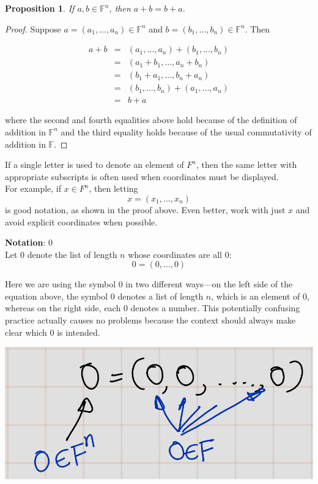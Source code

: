 \documentclass[
]{book}
\newtheorem{proposition}{Proposition}[chapter]
\theoremstyle{definition}
\theoremstyle{definition}
\theoremstyle{definition}
\theoremstyle{definition}
\theoremstyle{remark}
\begin{document}
\begin{proposition}
\protect\hypertarget{prp:unnamed-chunk-12}{}\label{prp:unnamed-chunk-12}If \(a, b \in \mathbb{F}^n\), then \(a+b=b+a\).
\end{proposition}

\begin{proof}
Suppose \(a = (a_1, …, a_n) \in \mathbb{F}^n\) and \(b = (b_1, …, b_n) \in \mathbb{F}^n\). Then

\begin{eqnarray}
a+b
&=& (a_1,…,a_n) + (b_1,…,b_n)\\
&=& (a_1 + b_1, …, a_n + b_n)\\
&=& (b_1 + a_1, …, b_n + a_n)\\
&=& (b_1,…,b_n) + (a_1,…,a_n)\\
&=& b+a
\end{eqnarray}

where the second and fourth equalities above hold because of the definition of addition in \(\mathbb{F}^n\) and the third equality holds because of the usual commutativity of addition in \(\mathbb{F}\).
\end{proof}

If a single letter is used to denote an element of \(F^n\), then the same letter with appropriate subscripts is often used when coordinates must be displayed.\\
For example, if \(x \in F^n\), then letting \[x=(x_1, \ldots, x_n)\] is good notation, as shown in the proof above. Even better, work with just \(x\) and avoid explicit coordinates when possible.

\textbf{Notation}: \(0\)\\
Let \(0\) denote the list of length \(n\) whose coordinates are all \(0\):
\[ 0 = (0, \ldots, 0) \]

Here we are using the symbol \(0\) in two different ways---on the left side of the equation above, the symbol \(0\) denotes a list of length \(n\), which is an element of \(0\), whereas on the right side, each \(0\) denotes a number. This potentially confusing practice actually causes no problems because the context should always make clear which \(0\) is intended.

\includegraphics[width=13.08in]{fig/Chapter-1/fig1}
\end{document}
